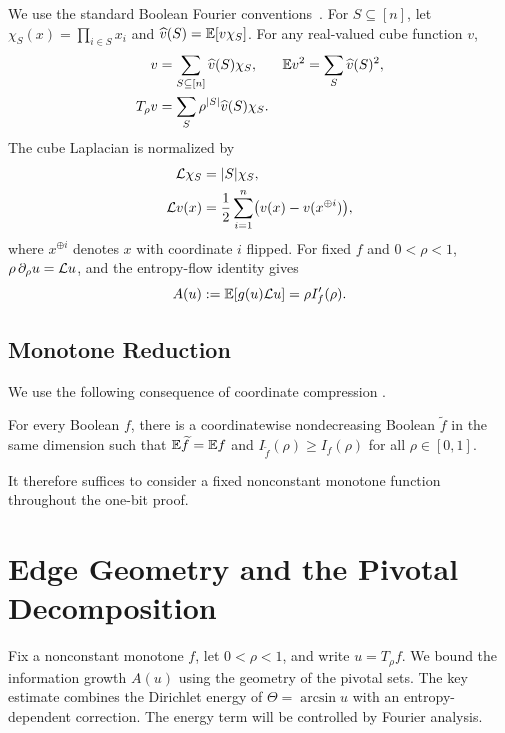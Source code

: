 We use the standard Boolean Fourier conventions~\cite{ODonnell}.
For \(S\subseteq[n]\), let \(\chi_S(x)=\prod_{i\in S}x_i\) and
\(\widehat v(S)=\mathbb E[v\chi_S]\). For any real-valued cube function \(v\),
\begin{align*}
 v&=\sum_{S\subseteq[n]}\widehat v(S)\chi_S,
 &\mathbb E v^2&=\sum_S\widehat v(S)^2,\\
 T_\rho v&=\sum_S\rho^{|S|}\widehat v(S)\chi_S.
\end{align*}
The cube Laplacian is normalized by
\begin{align*}
 \mathcal L\chi_S&=|S|\chi_S,\\
 \mathcal L v(x)&=\frac12\sum_{i=1}^n
       \bigl(v(x)-v(x^{\oplus i})\bigr),
\end{align*}
where \(x^{\oplus i}\) denotes \(x\) with coordinate \(i\) flipped.
For fixed \(f\) and \(0<\rho<1\),
\(\rho\,\partial_\rho u=\mathcal L u\), and the entropy-flow identity
\cite[Lemma~1]{CGN} gives
\begin{equation}
 A(u):=\mathbb E[g(u)\mathcal L u]=\rho I_f'(\rho).
 \label{eq:action}
\end{equation}

\subsection{Monotone Reduction}

We use the following consequence of coordinate compression
\cite[Lemma~2 and Remark~2]{CK}.
\begin{lemma}
\label{lem:sorting}
For every Boolean \(f\), there is a coordinatewise nondecreasing
Boolean \(\widetilde f\) in the same dimension such that
\(\mathbb E\widetilde f=\mathbb E f\) and
\(I_{\widetilde f}(\rho)\ge I_f(\rho)\) for all \(\rho\in[0,1]\).
\end{lemma}
It therefore suffices to consider a fixed nonconstant monotone
function throughout the one-bit proof.


\section{Edge Geometry and the Pivotal Decomposition}
\label{sec:edges}

Fix a nonconstant monotone \(f\), let \(0<\rho<1\), and write
\(u=T_\rho f\). We bound the information growth \(A(u)\) using
the geometry of the pivotal sets. The key estimate combines the
Dirichlet energy of \(\Theta=\arcsin u\) with an entropy-dependent
correction. The energy term will be controlled by Fourier analysis.

